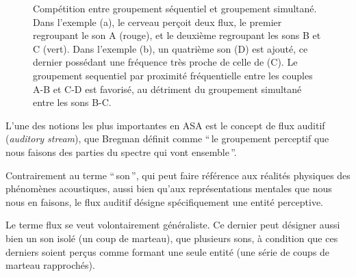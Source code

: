 \begin{figure}[t]
        \myfloatalign
        \caption[Compétition entre groupement séquentiel et groupement simultané.]{Compétition entre groupement séquentiel et groupement simultané. Dans l'exemple (a), le cerveau perçoit deux flux, le premier regroupant le son A (rouge), et le deuxième regroupant les sons B et C (vert). Dans l'exemple (b), un quatrième son (D) est ajouté, ce dernier possédant une fréquence très proche de celle de (C). Le groupement sequentiel par proximité fréquentielle entre les couples A-B et C-D est favorisé, au détriment du groupement simultané entre les sons B-C.}\label{fig:simvsseq}
\end{figure}

L'une des notions les plus importantes en ASA est le concept de flux auditif (\emph{auditory stream}), que Bregman définit comme ``\,le groupement perceptif que nous faisons des parties du spectre qui vont ensemble\,''.

Contrairement au terme ``\,son\,'', qui peut faire référence aux réalités physiques des phénomènes acoustiques, aussi bien qu'aux représentations mentales que nous nous en faisons, le flux auditif désigne spécifiquement une entité perceptive.

Le terme flux se veut volontairement généraliste. Ce dernier peut désigner aussi bien un son isolé (un coup de marteau), que plusieurs sons, à condition que ces derniers soient perçus comme formant une seule entité (une série de coups de marteau rapprochés).

